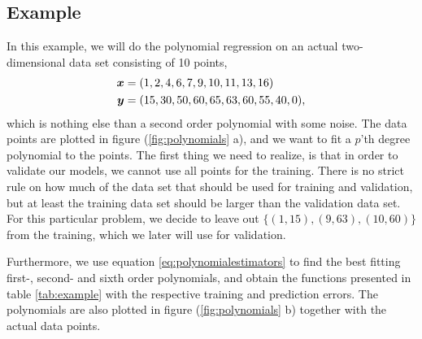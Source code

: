 \subsection{Example} \label{sec:example}
In this example, we will do the polynomial regression on an actual two-dimensional data set consisting of 10 points,
\begin{align}
\boldsymbol{{x}}&=(1,2,4,6,7,9,10,11,13,16)\notag\\
\boldsymbol{{y}}&=(15,30,50,60,65,63,60,55,40,0),
\label{eq:datapoints}
\end{align}
which is nothing else than a second order polynomial with some noise. The data points are plotted in figure (\ref{fig:polynomials} a), and we want to fit a $p$'th degree polynomial to the points. The first thing we need to realize, is that in order to validate our models, we cannot use all points for the training. There is no strict rule on how much of the data set that should be used for training and validation, but at least the training data set should be larger than the validation data set. For this particular problem, we decide to leave out $\{(1,15),(9,63),(10,60)\}$ from the training, which we later will use for validation.

Furthermore, we use equation \eqref{eq:polynomialestimators} to find the best fitting first-, second- and sixth order polynomials, and obtain the functions presented in table \eqref{tab:example} with the respective training and prediction errors. The polynomials are also plotted in figure (\ref{fig:polynomials} b) together with the actual data points.

